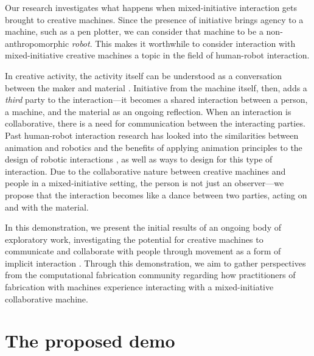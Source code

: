 \documentclass[sigconf,anonymous=false]{acmart}
\begin{document}
Our research investigates what happens when mixed-initiative interaction gets brought to creative machines. Since the presence of initiative brings agency to a machine, such as a pen plotter, we can consider that machine to be a non-anthropomorphic \textit{robot}. This makes it worthwhile to consider interaction with mixed-initiative creative machines a topic in the field of human-robot interaction.

In creative activity, the activity itself can be understood as a conversation between the maker and material \cite{schon1983reflective}. Initiative from the machine itself, then, adds a \textit{third} party to the interaction---it becomes a shared interaction between a person, a machine, and the material as an ongoing reflection. When an interaction is collaborative, there is a need for communication between the interacting parties. Past human-robot interaction research has looked into the similarities between animation and robotics and the benefits of applying animation principles to the design of robotic interactions \cite{takayama_expressing_2011}, as well as ways to design for this type of interaction. Due to the collaborative nature between creative machines and people in a mixed-initiative setting, the person is not just an observer---we propose that the interaction becomes like a dance between two parties, acting on and with the material.

In this demonstration, we present the initial results of an ongoing body of exploratory work, investigating the potential for creative machines to communicate and collaborate with people through movement as a form of implicit interaction \cite{ju_design_2015}. Through this demonstration, we aim to gather perspectives from the computational fabrication community regarding how practitioners of fabrication with machines experience interacting with a mixed-initiative collaborative machine. 

\section{The proposed demo} 

\end{document}

